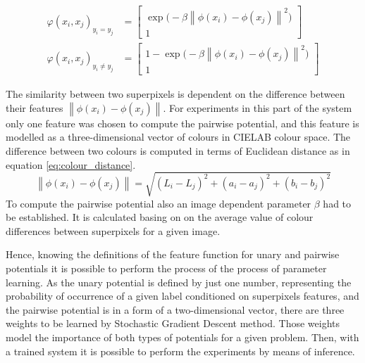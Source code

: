\begin{align}
    \label{eq:nonlinear_potts_model_extended}
        \varphi(x_i,x_j)_{y_i = y_j} &= \begin{bmatrix}
           \exp{\big(-\beta \left \| \phi(x_i) - \phi(x_j)\right \|^2\big)} \\
            1
        \end{bmatrix} \\
    \varphi(x_i,x_j)_{y_i \neq y_j} &= \begin{bmatrix}
           1 -\exp{\big(-\beta \left \| \phi(x_i) - \phi(x_j)\right \|^2\big)} \\
            1
        \end{bmatrix}
    \label{eq:nonlinear_potts_model_extended_2}
\end{align}

The similarity between two superpixels is dependent on the difference between their features $ \left \| \phi(x_i) - \phi(x_j)\right \|$. For experiments in this part of the system only one feature was chosen to compute the pairwise potential, and this feature is modelled as a three-dimensional vector of colours in CIELAB colour space. The difference between two colours is computed in terms of Euclidean distance as in equation \ref{eq:colour_distance}. 
\begin{equation}
    \label{eq:colour_distance}
    \left \| \phi(x_i) - \phi(x_j)\right \|=\sqrt {(L_i-L_j)^2+(a_i-a_j)^2+(b_i-b_j)^2}
\end{equation}
To compute the pairwise potential also an image dependent parameter $\beta$ had to be established. It is calculated basing on on the average value of colour differences between superpixels for a given image.

Hence, knowing the definitions of the feature function for unary and pairwise potentials it is possible to perform the process of the process of parameter learning. As the unary potential is defined by just one number, representing the probability of occurrence of a given label conditioned on superpixels features, and the pairwise potential is in a form of a two-dimensional vector, there are three weights to be learned by Stochastic Gradient Descent method. Those weights model the importance of both types of potentials for a given problem. Then, with a trained system it is possible to perform the experiments by means of inference.

